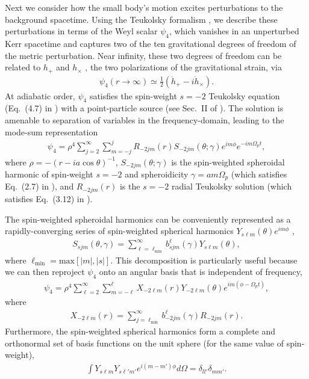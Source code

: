 \documentclass[%
 reprint,
 nofootinbib,
 amsmath,amssymb,
 aps,
 prd,
]{revtex4-2}
\begin{document}
Next we consider how the small body's motion excites perturbations to the background spacetime. Using the Teukolsky formalism \cite{Teuk73}, we describe these perturbations in terms of the Weyl scalar $\psi_4$, which vanishes in an unperturbed Kerr spacetime and captures two of the ten gravitational degrees of freedom of the metric perturbation. Near infinity, these two degrees of freedom can be related to $h_+$ and $h_\times$ \cite{DrasHugh06}, the two polarizations of the gravitational strain, via
\begin{align} \label{eqn:psi4ToH}
    \psi_4 (r\rightarrow \infty) \simeq \frac{1}{2}(\ddot{h}_+ - i \ddot{h}_\times).
\end{align}
At adiabatic order, $\psi_4$ satisfies the spin-weight $s=-2$ Teukolsky equation (Eq.~(4.7) in \cite{Teuk73}) with a point-particle source (see Sec.~II of \cite{SasaTago03}). The solution is amenable to separation of variables in the frequency-domain, leading to the mode-sum representation
\begin{align} \label{eqn:psi4Modes}
    \psi_4 = \rho^{4} \sum_{j=2}^\infty \sum_{m=-j}^j R_{-2jm}(r) S_{-2jm}(\theta;\gamma) e^{im\phi} e^{-im\Omega_pt},
\end{align}
where $\rho = -(r-ia\cos\theta)^{-1}$, $S_{-2jm}(\theta;\gamma)$ is the spin-weighted spheroidal harmonic of spin-weight $s=-2$ and spheroidicity $\gamma=a m\Omega_p$ (which satisfies Eq.~(2.7) in \cite{TeukPres74}), and $R_{-2jm}(r)$ is the $s=-2$ radial Teukolsky solution (which satisfies Eq.~(3.12) in \cite{DrasHugh06}).

The spin-weighted spheroidal harmonics can be conveniently represented as a rapidly-converging series of spin-weighted spherical harmonics $Y_{s\ell m}(\theta)e^{im\phi}$ \cite{Hugh00b},
\begin{align}
    S_{sjm}(\theta, \gamma) = \sum_{\ell=\ell_\mathrm{min}}^\infty b_{sjm}^\ell(\gamma) Y_{s\ell m}(\theta),
\end{align}
where $\ell_\mathrm{min}=\mathrm{max}[|m|,|s|]$. This decomposition is particularly useful because we can then reproject $\psi_4$ onto an angular basis that is independent of frequency,
\begin{align} \label{eqn:psi4LModes}
    \psi_4 = \rho^{4} \sum_{\ell=2}^\infty \sum_{m=-\ell}^\ell X_{-2\ell m}(r) Y_{-2\ell m}(\theta)e^{im(\phi - \Omega_pt)},
\end{align}
where
\begin{align} \label{eqn:XfromR}
    X_{-2\ell m}(r) = \sum_{j=\ell_\mathrm{min}}^\infty b_{-2jm}^\ell(\gamma)R_{-2jm}(r).
\end{align}
Furthermore, the spin-weighted spherical harmonics form a complete and orthonormal set of basis functions on the unit sphere (for the same value of spin-weight),
\begin{align}
    \int Y_{s\ell m} {Y}_{s\ell'm'} e^{i(m-m')\phi} d\Omega = \delta_{l l'} \delta_{m m'}.
\end{align}
\end{document}
